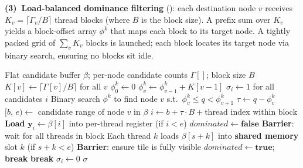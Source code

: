 \documentclass[letterpaper]{article}
\begin{document}
\textbf{(3)~Load-balanced dominance filtering} (): each destination node $v$ receives $K_v = \lceil \Gamma_v / B \rceil$ thread blocks (where $B$ is the block size). A prefix sum over $K_v$ yields a block-offset array $\phi^k$ that maps each block to its target node. A tightly packed grid of $\sum_v K_v$ blocks is launched; each block locates its target node via binary search, ensuring no blocks sit idle.

\begin{algorithm}[tbp]
\caption{GPU Dominance Filtering: Dynamic 1D Load-Balanced Scheduling}
\label{alg:dynamic_1D_kernel}
\begin{algorithmic}[1]
\Require Flat candidate buffer $\beta$; per-node candidate counts $\Gamma[]$; block size $B$
\State $K[v] \gets \lceil \Gamma[v] / B \rceil$ for all $v$
\State $\phi^k_0 \gets 0$
    \State $\phi^k_v \gets \phi^k_{v-1} + K[v-1]$
\EndFor
\State $\sigma_i \gets 1$ for all candidates $i$
    \State Binary search $\phi^k$ to find node $v$ s.t.\ $\phi^k_v \le q < \phi^k_{v{+}1}$
    \State $\tau \gets q - \phi^k_v$ 
    \State $[b,\, e) \gets$ candidate range of node $v$ in $\beta$
    \State $i \gets b + \tau \cdot B + \text{thread index within block}$
    \State \textbf{Load} $\mathbf{y}_i \gets \beta[i]$ into per-thread register (if $i < e$) 
    \State $\mathit{dominated} \gets \mathbf{false}$
        \State \textbf{Barrier}: wait for all threads in block
        \State Each thread $k$ loads $\beta[s{+}k]$ into \textbf{shared memory} slot $k$ \;(if $s{+}k < e$)
        \State \textbf{Barrier}: ensure tile is fully visible
                \; $\mathit{dominated} \gets \mathbf{true}$; \textbf{break} \EndIf
            \EndFor {}
        \EndIf
         \textbf{break} \EndIf {}
    \EndFor
    \; $\sigma_i \gets 0$ \EndIf
\EndFor
\State \Return $\sigma$
\EndProcedure
\end{algorithmic}
\end{algorithm}
\end{document}
